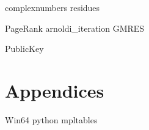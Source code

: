 \documentclass[nociteref]{SIAM-GH-book}
\begin{document}
{complexnumbers}
{residues}


{PageRank}
{arnoldi_iteration}
{GMRES}



{PublicKey}

\part{Appendices}
{Win64}
{python}
{mpltables}
\end{document}
